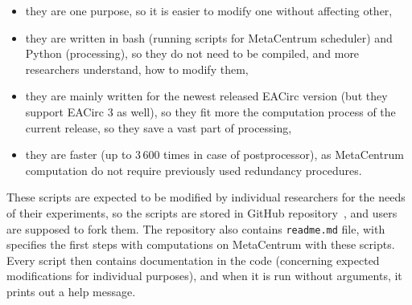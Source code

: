 \documentclass[
  print, %
  Table,   %
  nolof,     %
  nolot,     %
  11pt, %
  oneside  %
]{fithesis3}
\begin{document}
\begin{itemize}
    \item they are one purpose, so it is easier to modify one without affecting other,
    \item they are written in bash (running scripts for MetaCentrum scheduler) and Python (processing), so they do not need to be compiled, and more researchers understand, how to modify them,
    \item they are mainly written for the newest released EACirc version (but they support EACirc 3 as well), so they fit more the computation process of the current release, so they save a vast part of processing,
    \item they are faster (up to 3\,600 times in case of postprocessor), as MetaCentrum computation do not require previously used redundancy procedures.
\end{itemize}

These scripts are expected to be modified by individual researchers for the needs of their experiments, so the scripts are stored in GitHub repository~\cite{eaUtils}, and users are supposed to fork them. The repository also contains \texttt{readme.md} file, with specifies the first steps with computations on MetaCentrum with these scripts. Every script then contains documentation in the code (concerning expected modifications for individual purposes), and when it is run without arguments, it prints out a help message.
\end{document}
